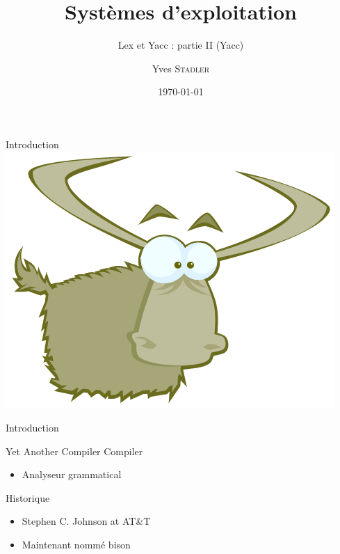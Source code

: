 
\title{Systèmes d'exploitation}
\subtitle{Lex et Yacc : partie II (Yacc)}

\author{Yves \textsc{Stadler}}

\date{\today}




\begin{frame}
\titlepage
\end{frame}


\def\ftitle{Introduction}
\begin{frame}[containsverbatim]{\ftitle}
\includegraphics[width=\textwidth]{images/yak.png}
\end{frame}

\def\ftitle{Introduction}
\begin{frame}[containsverbatim]{\ftitle}
\def\blocktitle{Yet Another Compiler Compiler}
\begin{block}{\blocktitle}
\begin{itemize}
\item Analyseur grammatical
\end{itemize}
\end{block}
\def\blocktitle{Historique}
\begin{block}{\blocktitle}
\begin{itemize}
\item Stephen C. Johnson at AT\&T 
\item Maintenant nommé bison
\end{itemize}
\end{block}
\end{frame}


